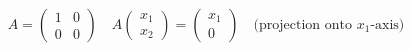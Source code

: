 \begin{eg}
\begin{enumerate}[label=$\arabic*^\circ$]
        \[
            A = \begin{pmatrix}
                1 & 0 \\
                0 & 0
            \end{pmatrix} \quad A\begin{pmatrix}
                x_1 \\ x_2
            \end{pmatrix} = \begin{pmatrix}
                x_1 \\ 0
            \end{pmatrix} \quad \text{(projection onto $x_1$-axis)}
        \]
    \end{enumerate}
\end{eg}

\newpage
